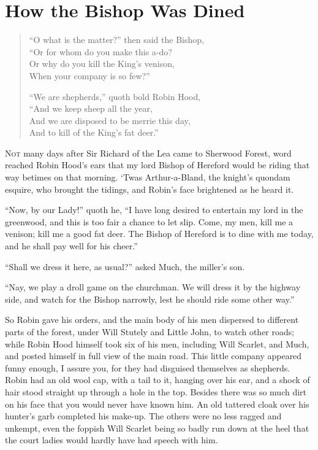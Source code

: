 \chapter{How the Bishop Was Dined}

\begin{quote}
“O what is the matter?” then said the Bishop,\\
“Or for whom do you make this a-do?\\
Or why do you kill the King’s venison,\\
When your company is so few?”

“We are shepherds,” quoth bold Robin Hood,\\
“And we keep sheep all the year,\\
And we are disposed to be merrie this day,\\
And to kill of the King’s fat deer.”
\end{quote}

\lettrine{N}{ot} many days after Sir Richard of the Lea came to Sherwood
Forest, word reached Robin Hood's ears that my lord Bishop of Hereford
would be riding that way betimes on that morning. `Twas Arthur-a-Bland,
the knight's quondam esquire, who brought the tidings, and Robin's face
brightened as he heard it.

``Now, by our Lady!'' quoth he, ``I have long desired to entertain my
lord in the greenwood, and this is too fair a chance to let slip. Come,
my men, kill me a venison; kill me a good fat deer. The Bishop of
Hereford is to dine with me today, and he shall pay well for his
cheer.''

``Shall we dress it here, as usual?'' asked Much, the miller's son.

``Nay, we play a droll game on the churchman. We will dress it by the
highway side, and watch for the Bishop narrowly, lest he should ride
some other way.''

So Robin gave his orders, and the main body of his men dispersed to
different parts of the forest, under Will Stutely and Little John, to
watch other roads; while Robin Hood himself took six of his men,
including Will Scarlet, and Much, and posted himself in full view of the
main road. This little company appeared funny enough, I assure you, for
they had disguised themselves as shepherds. Robin had an old wool cap,
with a tail to it, hanging over his ear, and a shock of hair stood
straight up through a hole in the top. Besides there was so much dirt on
his face that you would never have known him. An old tattered cloak over
his hunter's garb completed his make-up. The others were no less ragged
and unkempt, even the foppish Will Scarlet being so badly run down at
the heel that the court ladies would hardly have had speech with him.

